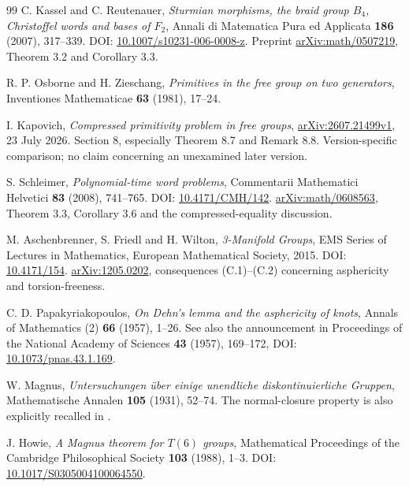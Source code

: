 \documentclass[11pt,letterpaper]{article}
\theoremstyle{definition}
\begin{document}
\begin{thebibliography}{99}
C. Kassel and C. Reutenauer,
\emph{Sturmian morphisms, the braid group $B_4$, Christoffel words and bases
of $F_2$}, Annali di Matematica Pura ed Applicata \textbf{186} (2007),
317--339. DOI: \href{https://doi.org/10.1007/s10231-006-0008-z}{10.1007/s10231-006-0008-z}.
Preprint \href{https://arxiv.org/abs/math/0507219}{arXiv:math/0507219},
Theorem 3.2 and Corollary 3.3.

R. P. Osborne and H. Zieschang,
\emph{Primitives in the free group on two generators},
Inventiones Mathematicae \textbf{63} (1981), 17--24.

I. Kapovich, \emph{Compressed primitivity problem in free groups},
\href{https://arxiv.org/abs/2607.21499v1}{arXiv:2607.21499v1},
23 July 2026. Section 8, especially Theorem 8.7 and Remark 8.8.
Version-specific comparison; no claim concerning an unexamined later version.

S. Schleimer, \emph{Polynomial-time word problems},
Commentarii Mathematici Helvetici \textbf{83} (2008), 741--765.
DOI: \href{https://doi.org/10.4171/CMH/142}{10.4171/CMH/142}.
\href{https://arxiv.org/abs/math/0608563}{arXiv:math/0608563},
Theorem 3.3, Corollary 3.6 and the compressed-equality discussion.

M. Aschenbrenner, S. Friedl and H. Wilton,
\emph{3-Manifold Groups}, EMS Series of Lectures in Mathematics,
European Mathematical Society, 2015.
DOI: \href{https://doi.org/10.4171/154}{10.4171/154}.
\href{https://arxiv.org/abs/1205.0202}{arXiv:1205.0202},
consequences (C.1)--(C.2) concerning asphericity and torsion-freeness.

C. D. Papakyriakopoulos,
\emph{On Dehn's lemma and the asphericity of knots},
Annals of Mathematics (2) \textbf{66} (1957), 1--26.
See also the announcement in Proceedings of the National Academy of
Sciences \textbf{43} (1957), 169--172,
DOI: \href{https://doi.org/10.1073/pnas.43.1.169}{10.1073/pnas.43.1.169}.

W. Magnus, \emph{Untersuchungen \"uber einige unendliche diskontinuierliche
Gruppen}, Mathematische Annalen \textbf{105} (1931), 52--74.
The normal-closure property is also explicitly recalled in \cite{Howie}.

J. Howie, \emph{A Magnus theorem for $T(6)$ groups},
Mathematical Proceedings of the Cambridge Philosophical Society
\textbf{103} (1988), 1--3.
DOI: \href{https://doi.org/10.1017/S0305004100064550}{10.1017/S0305004100064550}.


\end{thebibliography}
\end{document}
